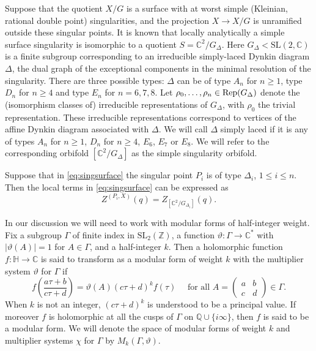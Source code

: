 \documentclass[11pt,a4paper]{amsart}
\theoremstyle{definition}
\newcommand{\SZ}{\mathbb{Z}}                    %
\newcommand{\SQ}{\mathbb{Q}}                    %
\newcommand{\SC}{\mathbb{C}}                    %
\begin{document}
Suppose that the quotient $X/G$ is a surface with at worst simple (Kleinian, rational 
double point) singularities, and the projection $ X \to X/G$ is unramified outside these singular points. 
It is known that locally analytically a simple surface singularity is isomorphic to a quotient $S=\SC^2/G_\Delta$. Here $G_\Delta<\mathrm{SL}(2,\SC)$ is a finite subgroup corresponding to an irreducible simply-laced Dynkin diagram $\Delta$, the dual graph of the
exceptional components in the minimal resolution of the singularity. There are three possible types: 
$\Delta$ can be of type $A_n$ for $n\geq 1$, type $D_n$ for $n\geq 4$ and type $E_n$ for $n=6,7,8$. 
Let $\rho_0,\ldots,\rho_n\in\mathop{\rm Rep}(G_\Delta)$ denote the (isomorphism classes of) irreducible representations of $G_\Delta$, with $\rho_0$ the trivial representation. These irreducible representations correspond to vertices of the affine Dynkin diagram associated with $\Delta$. %
We will call $\Delta$ simply laced if it is any  of types $A_n$ for $n \geq 1$, $D_n$ for $n \geq 4$, $E_6$, $E_7$ or $E_8$. We will refer to the corresponding orbifold $[\SC^2/G_\Delta]$ as the simple singularity orbifold. 

Suppose that in \eqref{eq:singsurface} the singular point $P_i$ is of type $\Delta_i$, $1 \leq i \leq n$. Then the local terms in \eqref{eq:singsurface} can be expressed as
\begin{equation} Z^{(P_i, X)}(q) = Z_{[\SC^2/G_{\Delta_i}]}(q). \label{eq:localterms} \end{equation}

In our discussion we will need to work with modular forms of half-integer weight. Fix a subgroup $\Gamma$ of finite index in $\mathrm{SL_2}(\SZ)$, a function $\vartheta \colon \Gamma \to \SC^{\ast}$ with $|\vartheta(A)|=1$ for $A \in \Gamma$, and a half-integer $k$. Then a holomorphic function $f \colon \mathbb{H} \to \SC$ is said to transform as a modular form of weight $k$ with the multiplier system $\vartheta$ for $\Gamma$ if
\[ f\left( \frac{a\tau+b}{c\tau+d}\right)=\vartheta(A)(c\tau+d)^k f(\tau) \quad \textrm{ for all } A=\begin{pmatrix}
a & b \\ c & d
\end{pmatrix} \in \Gamma. \]
When $k$ is not an integer, $(c\tau+d)^k$ is understood to be a principal value. If moreover $f$ is holomorphic at all the cusps of $\Gamma$ on $\SQ \cup \{i \infty\}$, then $f$ is said to be a modular form. We will denote the space of modular forms of weight $k$ and multiplier systems $\chi$ for $\Gamma$ by $M_k(\Gamma, \vartheta)$.
\end{document}

